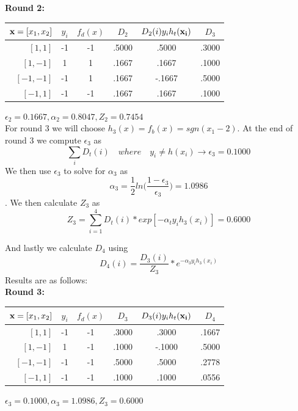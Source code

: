 \documentclass[11pt,a4paper]{article}
\begin{document}
\begin{itemize}
			\textbf{Round 2:}
			\begin{center}
				\begin{tabular}{rccccc}
					\toprule
					${\bf x} = [x_1,x_2]$ & $y_i$ & $f_d(x)$ & $D_2$ & $D_{2}(i)y_{i}h_t({\bf x_i})$ & $D_3$ \\
					\midrule
					$[1,  1]$             & -1    & -1       & .5000   & .5000                       &  .3000     \\
					$[1, -1]$             & 1     & 1        & .1667   & .1667                       &  .1000     \\
					$[-1,-1]$             & -1    & 1        & .1667   & -.1667                      &  .5000     \\
					$[-1, 1]$             & -1    & -1       & .1667   & .1667                       &  .1000     \\
					\bottomrule
				\end{tabular}
			\end{center}
			$\epsilon_2 = 0.1667, \alpha_2 = 0.8047, Z_2 = 0.7454$ \\
			
			For round 3 we will choose $h_3(x) = f_b(x) = sgn(x_1 - 2)$. At the end of round 3 we compute $\epsilon_3$ as $$\displaystyle\sum_{i} D_t (i) \quad where \quad y_i \neq h(x_i) \rightarrow \epsilon_3 = 0.1000 $$ We then use $\epsilon_3$ to solve for $\alpha_3$ as $$\alpha_3 = \frac{1}{2} ln \Big( \frac{1-\epsilon_3}{\epsilon_3} \Big) = 1.0986$$. We then calculate $Z_3$ as $$Z_3 = \displaystyle\sum_{i=1}^4 D_t(i)*exp[-\alpha_t y_i h_3(x_i)] = 0.6000$$
			
			And lastly we calculate $D_4$ using $$D_4(i) = \frac{D_3(i)}{Z_3}*e^{-\alpha_3 y_i h_3(x_i)}$$ Results are as follows:\\
			
			\textbf{Round 3:}
			\begin{center}
				\begin{tabular}{rccccc}
					\toprule
					${\bf x} = [x_1,x_2]$ & $y_i$ & $f_d(x)$ & $D_3$ & $D_{3}(i)y_{i}h_t({\bf x_i})$ & $D_4$ \\
					\midrule
					$[1,  1]$             & -1    & -1       & .3000   & .3000                       & .1667      \\
					$[1, -1]$             & 1     & -1       & .1000   & -.1000                      & .5000      \\
					$[-1,-1]$             & -1    & -1       & .5000   & .5000                       & .2778      \\
					$[-1, 1]$             & -1    & -1       & .1000   & .1000                       & .0556      \\
					\bottomrule
				\end{tabular}
			\end{center}
			$\epsilon_3 = 0.1000, \alpha_3 = 1.0986, Z_3 = 0.6000$ \\
			

\end{itemize}
\end{document}
